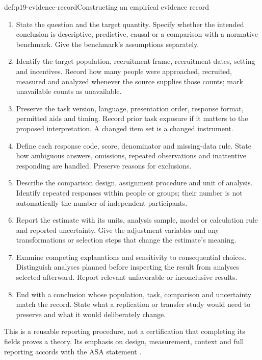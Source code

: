 \begin{hbmethod}{def:p19-evidence-record}{Constructing an empirical evidence record}
\begin{enumerate}
\item State the question and the target quantity. Specify whether the intended
      conclusion is descriptive, predictive, causal or a comparison with a
      normative benchmark. Give the benchmark's assumptions separately.
\item Identify the target population, recruitment frame, recruitment dates,
      setting and incentives. Record how many people were approached,
      recruited, measured and analyzed whenever the source supplies those
      counts; mark unavailable counts as unavailable.
\item Preserve the task version, language, presentation order, response format,
      permitted aids and timing. Record prior task exposure if it matters to
      the proposed interpretation. A changed item set is a changed instrument.
\item Define each response code, score, denominator and missing-data rule.
      State how ambiguous answers, omissions, repeated observations and
      inattentive responding are handled. Preserve reasons for exclusions.
\item Describe the comparison design, assignment procedure and unit of
      analysis. Identify repeated responses within people or groups; their
      number is not automatically the number of independent participants.
\item Report the estimate with its units, analysis sample, model or calculation
      rule and reported uncertainty. Give the adjustment variables and any
      transformations or selection steps that change the estimate's meaning.
\item Examine competing explanations and sensitivity to consequential choices.
      Distinguish analyses planned before inspecting the result from analyses
      selected afterward. Report relevant unfavorable or inconclusive results.
\item End with a conclusion whose population, task, comparison and uncertainty
      match the record. State what a replication or transfer study would need
      to preserve and what it would deliberately change.
\end{enumerate}
This is a reusable reporting procedure, not a certification that completing
its fields proves a theory. Its emphasis on design, measurement, context and
full reporting accords with the ASA statement
\cite[pp.~131--132]{WassersteinLazar2016ASA}.
\end{hbmethod}

